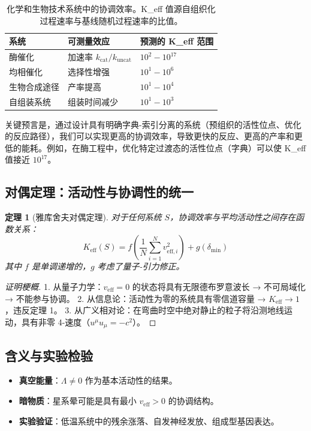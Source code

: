 \documentclass[11pt,a4paper]{article}
\newtheorem{theorem}{定理}
\begin{document}
	\begin{table}[htbp]
		\centering
		\small
		\begin{tabular}{p{}p{}p{}}
			\toprule
			\textbf{系统} & \textbf{可测量效应} & \textbf{预测的 K\_eff 范围} \\
			\midrule
			酶催化 & 加速率 $k_{\text{cat}}/k_{\text{uncat}}$ & $10^2 - 10^{17}$ \\
			均相催化 & 选择性增强 & $10^1 - 10^6$ \\
			生物合成途径 & 产率提高 & $10^1 - 10^4$ \\
			自组装系统 & 组装时间减少 & $10^1 - 10^3$ \\
			\bottomrule
		\end{tabular}
		\caption{化学和生物技术系统中的协调效率。K\_eff 值源自组织化过程速率与基线随机过程速率的比值。}
		\label{tab:chemical-keff}
	\end{table}
	
	关键预言是，通过设计具有明确字典-索引分离的系统（预组织的活性位点、优化的反应路径），我们可以实现更高的协调效率，导致更快的反应、更高的产率和更低的能耗。例如，在酶工程中，优化特定过渡态的活性位点（字典）可以使 K\_eff 值接近 $10^{17}$。
	
	\subsection{对偶定理：活动性与协调性的统一}
	
	\begin{theorem}[雅库舍夫对偶定理]
		对于任何系统 $S$，协调效率与平均活动性之间存在函数关系：
		\[
		K_{\mathrm{eff}}(S) = f\left( \frac{1}{N}\sum_{i=1}^N v_{\mathrm{eff},i}^2 \right) + g(\delta_{\min})
		\]
		其中 $f$ 是单调递增的，$g$ 考虑了量子-引力修正。
	\end{theorem}
	
	\begin{proof}[证明梗概]
		1. 从量子力学：$v_{\mathrm{eff}} = 0$ 的状态将具有无限德布罗意波长 → 不可局域化 → 不能参与协调。
		2. 从信息论：活动性为零的系统具有零信道容量 → $K_{\mathrm{eff}} \to 1$，违反定理 1。
		3. 从广义相对论：在弯曲时空中绝对静止的粒子将沿测地线运动，具有非零 4-速度（$u^\mu u_\mu = -c^2$）。
	\end{proof}
	
	\subsection{含义与实验检验}
	
	\begin{itemize}
		\item \textbf{真空能量}：$\Lambda \neq 0$ 作为基本活动性的结果。
		\item \textbf{暗物质}：星系晕可能是具有最小 $v_{\mathrm{eff}} > 0$ 的协调结构。
		\item \textbf{实验验证}：低温系统中的残余涨落、自发神经发放、组成型基因表达。
	\end{itemize}
	
\end{document}
